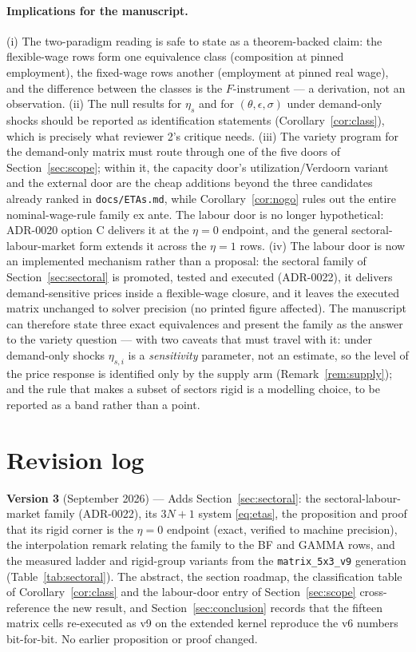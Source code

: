 \documentclass[11pt]{article}
\numberwithin{equation}{section}
\begin{document}
\paragraph{Implications for the manuscript.} (i) The two-paradigm reading
is safe to state as a theorem-backed claim: the flexible-wage rows form one
equivalence class (composition at pinned employment), the fixed-wage rows
another (employment at pinned real wage), and the difference between the
classes is the $F$-instrument --- a derivation, not an observation.
(ii) The null results for $\eta_s$ and for $(\theta,\epsilon,\sigma)$ under
demand-only shocks should be reported as identification statements
(Corollary~\ref{cor:class}), which is precisely what reviewer 2's critique
needs. (iii) The variety program for the demand-only matrix must route
through one of the five doors of Section~\ref{sec:scope}; within it, the
capacity door's utilization/Verdoorn variant and the external door are the
cheap additions beyond the three candidates already ranked in
\texttt{docs/ETAs.md}, while Corollary~\ref{cor:nogo} rules out the entire
nominal-wage-rule family ex ante. \textcolor{revisionV1}{The labour door is
no longer hypothetical: ADR-0020 option C delivers it at the $\eta = 0$
endpoint, and the general sectoral-labour-market form extends it across the
$\eta = 1$ rows.}
\textcolor{revisionV2}{(iv) The labour door is now an implemented mechanism
rather than a proposal: the sectoral family of Section~\ref{sec:sectoral} is
promoted, tested and executed (ADR-0022), it delivers demand-sensitive prices
inside a flexible-wage closure, and it leaves the executed matrix
\textcolor{revisionV3}{unchanged to solver precision (no printed figure
affected)}. The manuscript can therefore state three exact equivalences and
present the family as the answer to the variety question --- with two caveats
that must travel with it: under demand-only shocks $\eta_{s,i}$ is a
\emph{sensitivity} parameter, not an estimate, so the level of the price
response is identified only by the supply arm (Remark~\ref{rem:supply}); and
the rule that makes a subset of sectors rigid is a modelling choice, to be
reported as a band rather than a point.}

\section*{Revision log}

\noindent\textbf{Version 3} \textcolor{revisionV2}{(September 2026)} ---
Adds Section~\ref{sec:sectoral}: the sectoral-labour-market family (ADR-0022),
its $3N+1$ system \eqref{eq:etas}, the proposition and proof that its rigid
corner is the $\eta = 0$ endpoint (exact, verified to machine precision), the
interpolation remark relating the family to the BF and GAMMA rows, and the
measured ladder and rigid-group variants from the \texttt{matrix\_5x3\_v9}
generation (\textcolor{revisionV3}{Table~\ref{tab:sectoral}}). The abstract, the section roadmap, the
classification table of Corollary~\ref{cor:class} and the labour-door entry of
Section~\ref{sec:scope} cross-reference the new result, and
Section~\ref{sec:conclusion} records that the fifteen matrix cells re-executed
as v9 on the extended kernel reproduce the v6 numbers bit-for-bit. No earlier
proposition or proof changed.
\end{document}
